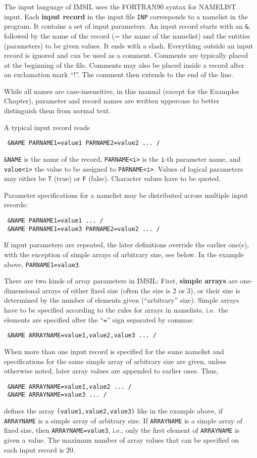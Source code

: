 The input language of IMSIL uses the FORTRAN90 syntax for NAMELIST input.  Each
\textbf{input record} in the input file \texttt{INP} corresponds to a namelist
in the program. It contains a set of input parameters.  An input record starts
with an \texttt{\&}, followed by the name of the record (= the name of the
namelist) and the entities (parameters) to be given values. It ends with a
slash. Everything outside an input record is ignored and can be used as a
comment. Comments are typically placed at the beginning of the file. Comments
may also be placed inside a record after an exclamation mark ``!''. The comment
then extends to the end of the line.

While all names are case-insensitive, in this manual (except for the
Examples Chapter), parameter and record names are written uppercase to better
distinguish them from normal text.

A typical input record reads
%
\begin{verbatim}
 &NAME PARNAME1=value1 PARNAME2=value2 ... /
\end{verbatim}
%
\texttt{\&NAME} is the name of the record, \texttt{PARNAME<i>}
is the \texttt{i}-th parameter name, and \texttt{value<i>} the value to be assigned
to \texttt{PARNAME<i>}. Values of logical parameters may either be \texttt{T}
(true) or \texttt{F} (false). Character values have to be quoted.

Parameter specifications for a namelist may be distributed across multiple input
records:
%
\begin{verbatim}
 &NAME PARNAME1=value1 ... /
 &NAME PARNAME1=value3 PARNAME2=value2 ... /
\end{verbatim}
%
If input parameters are repeated, the later definitions override the earlier
one(s), with the exception of simple arrays of arbitrary size, see below. In the
example above, \texttt{PARNAME1=value3}.

There are two kinds of array parameters in IMSIL: First, \textbf{simple arrays}
are one-dimensional arrays of either fixed size (often the size is 2
or 3), or their size is determined by the number of elements given
(``arbitrary'' size). Simple arrays have to be specified according to the rules
for arrays in namelists, i.e.\ the elements are specified after the
``\texttt{=}'' sign separated by commas:  
%
\begin{verbatim}
 &NAME ARRAYNAME=value1,value2,value3 ... /
\end{verbatim}
%
When more than one input record is specified for the same namelist and
specifications for the same simple array of arbitrary size are given,
unless otherwise noted, later array values are appended to earlier ones. Thus,
%
\begin{verbatim}
 &NAME ARRAYNAME=value1,value2 ... /
 &NAME ARRAYNAME=value3 ... /
\end{verbatim}
%
defines the array \texttt{(value1,value2,value3)} like in the example above, if
\texttt{ARRAYNAME} is a simple array of arbitrary size. If \texttt{ARRAYNAME} is
a simple array of fixed size, then \texttt{ARRAYNAME=value3}, i.e., only the
first element of \texttt{ARRAYNAME} is given a value. The maximum number of
array values that can be specified on each input record is 20.

